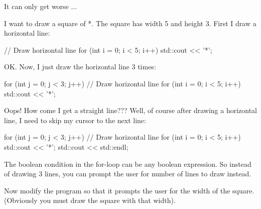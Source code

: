 \newpage{}

It can only get worse ...

I want to draw a square of *. The square has width 5 and height 3. First
I draw a horizontal line:
\begin{console}
// Draw horizontal line
for (int i = 0; i < 5; i++)
{   
    std::cout << '*';
}
\end{console}

OK. Now, I just draw the horizontal line 3 times:
\begin{console}
for (int j = 0; j < 3; j++)
{   
    // Draw horizontal line
    for (int i = 0; i < 5; i++)
    {   
        std::cout << '*';
    }
}
\end{console}

Oops! How come I get a straight line??? Well, of course after drawing a
horizontal line, I need to skip my cursor to the next line:
\begin{console}
for (int j = 0; j < 3; j++)
{   
    // Draw horizontal line
    for (int i = 0; i < 5; i++)
    {   
        std::cout << '*';
    }
    std::cout << std::endl;
}
\end{console}


The boolean condition in the for-loop can be any boolean expression. So
instead of drawing 3 lines, you can prompt the user for number of lines
to draw instead.


\begin{ex}
Now modify the program so that it prompts the user for the
width of the square. (Obviously you must draw the square with that
width).
\end{ex}

\newpage{}

